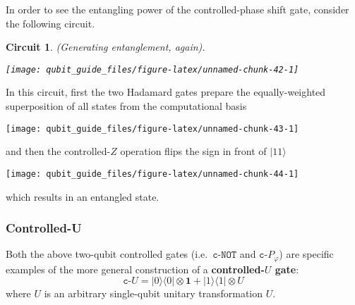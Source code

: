 \documentclass[fleqn]{article}
\newtheorem*{circuit}{Circuit}
\begin{document}
In order to see the entangling power of the controlled-phase shift gate, consider the following circuit.

\begin{circuit}

(Generating entanglement, again).

\begin{center}\texttt{[image: qubit\_guide\_files/figure-latex/unnamed-chunk-42-1]} \end{center}

\end{circuit}

In this circuit, first the two Hadamard gates prepare the equally-weighted superposition of all states from the computational basis

\begin{center}\texttt{[image: qubit\_guide\_files/figure-latex/unnamed-chunk-43-1]} \end{center}

and then the controlled-\(Z\) operation flips the sign in front of \(|11\rangle\)

\begin{center}\texttt{[image: qubit\_guide\_files/figure-latex/unnamed-chunk-44-1]} \end{center}

which results in an entangled state.

\hypertarget{controlled-u}{%
\subsubsection{Controlled-U}\label{controlled-u}}

Both the above two-qubit controlled gates (i.e.~\(\texttt{c-NOT}\) and \(\texttt{c-}P_\varphi\)) are specific examples of the more general construction of a \textbf{controlled-\(U\) gate}:
\[
  \texttt{c-}U
  = |0\rangle\langle 0|\otimes\mathbf{1}+ |1\rangle\langle 1|\otimes U
\]
where \(U\) is an arbitrary single-qubit unitary transformation \(U\).
\end{document}
